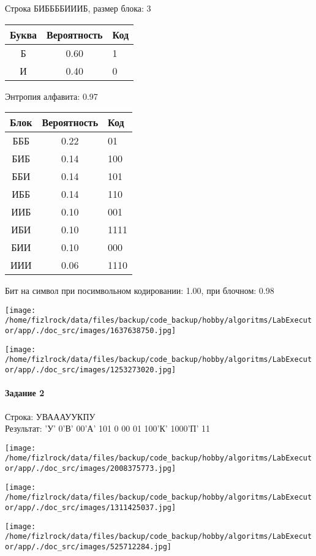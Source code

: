 \documentclass[a4paper, 12pt]{article}
\begin{document}
Строка БИББББИИИБ, размер блока: 3
\begin{center}
 \begin{tabular}{ |c|c|l| } 
  \hline
     Буква & Вероятность & Код\\ \hline
Б & 0.60 & 1\\\hline
И & 0.40 & 0
\\ \hline \end{tabular}
\end{center}
Энтропия алфавита: 0.97
\begin{center}
 \begin{tabular}{ |c|c|l| } 
  \hline
     Блок & Вероятность & Код\\ \hline
БББ & 0.22 & 01\\\hline
БИБ & 0.14 & 100\\\hline
ББИ & 0.14 & 101\\\hline
ИББ & 0.14 & 110\\\hline
ИИБ & 0.10 & 001\\\hline
ИБИ & 0.10 & 1111\\\hline
БИИ & 0.10 & 000\\\hline
ИИИ & 0.06 & 1110
\\ \hline \end{tabular}
\end{center}
Бит на символ при посимвольном кодировании: 1.00, при блочном: 0.98

\texttt{[image: /home/fizlrock/data/files/backup/code\_backup/hobby/algoritms/LabExecutor/app/./doc\_src/images/1637638750.jpg]}

\texttt{[image: /home/fizlrock/data/files/backup/code\_backup/hobby/algoritms/LabExecutor/app/./doc\_src/images/1253273020.jpg]}
\pagebreak
\paragraph{Задание 2}

Строка: 
УВАААУУКПУ\\
Результат: 'У' 0'В' 00'А' 101 0 00 01 100'К' 1000'П' 11

\texttt{[image: /home/fizlrock/data/files/backup/code\_backup/hobby/algoritms/LabExecutor/app/./doc\_src/images/2008375773.jpg]}

\texttt{[image: /home/fizlrock/data/files/backup/code\_backup/hobby/algoritms/LabExecutor/app/./doc\_src/images/1311425037.jpg]}

\texttt{[image: /home/fizlrock/data/files/backup/code\_backup/hobby/algoritms/LabExecutor/app/./doc\_src/images/525712284.jpg]}
\end{document}
